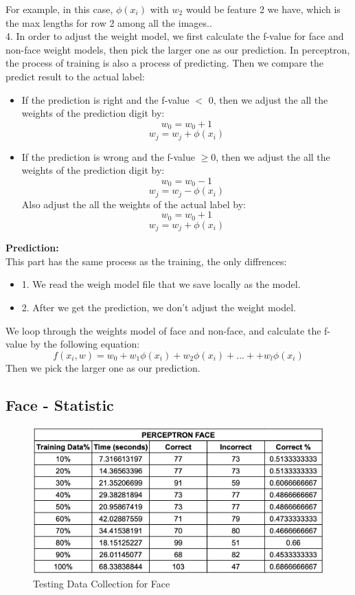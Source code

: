 \documentclass[11pt]{report}
\begin{document}
For example, in this case, $\phi(x_i)$ with $w_2$ would be feature 2 we have, which is the max lengths for row 2 among all the images.. \\


4. In order to adjust the weight model, we first calculate the f-value for face and non-face weight models, then pick the larger one as our prediction. In perceptron, the process of training is also a process of predicting. Then we compare the predict result to the actual label:
 \begin{itemize}
\item If the prediction is right and the f-value $<$ 0, then we adjust the all the weights of the prediction digit by:
$$w_0 = w_0 + 1$$
$$w_j = w_j + \phi(x_i)$$
\item If the prediction is wrong and the f-value $\geq 0$, then we adjust the all the weights of the prediction digit by:
$$w_0 = w_0 - 1$$
$$w_j = w_j - \phi(x_i)$$
Also adjust the all the weights of the actual label by:
$$w_0 = w_0 + 1$$
$$w_j = w_j + \phi(x_i)$$
\end{itemize}


\noindent \textbf{Prediction:} \\

This part has the same process as the training, the only diffrences: 
\begin{itemize}
\item 1.  We read the weigh model file that we save locally as the model. 
\item 2. After we get the prediction, we don't adjust the weight model.
\end{itemize}

We loop through the weights model of face and non-face, and calculate the f-value by the following equation:
$$f(x_i, w) = w_0 + w_1\phi(x_i)+ w_2\phi(x_i) + ... + + w_l\phi(x_i)$$
Then we pick the larger one as our prediction.

\subsection*{Face - Statistic}

\begin{figure}[h]
\begin{center}
\includegraphics[scale=0.5]{Perceptron_face_statistic.png} 
\end{center}
\caption{Testing Data Collection for Face}
\end{figure}
\end{document}
